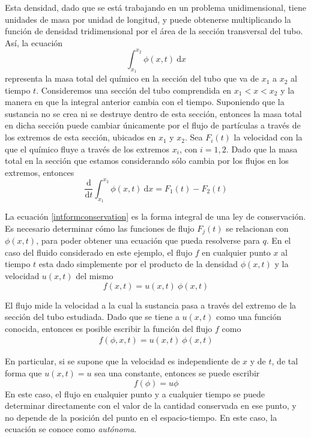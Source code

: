 \documentclass[11pt,twoside,openright,spanish]{report}
\numberwithin{equation}{chapter}
\numberwithin{figure}{chapter}
\numberwithin{table}{chapter}
\begin{document}
Esta densidad, dado que se está trabajando en un problema unidimensional, tiene unidades de masa por unidad de longitud, y puede obtenerse multiplicando la función de densidad tridimensional por el área de la sección transversal del tubo. Así, la ecuación
\begin{equation}
\int_{x_1}^{x_2}\phi(x,t)\ \text{d}x
\end{equation} 
representa la masa total del químico en la sección del tubo que va de $x_1$ a $x_2$ al tiempo $t$. Consideremos una sección del tubo comprendida en $x_1<x<x_2$ y la manera en que la integral anterior cambia con el tiempo. Suponiendo que la sustancia no se crea ni se destruye dentro de esta sección, entonces la masa total en dicha sección puede cambiar únicamente por el flujo de partículas a través de los extremos de esta sección, ubicados en $x_1$ y $x_2$. Sea $F_i(t)$ la velocidad con la que el químico fluye a través de los extremos $x_i$, con $i=1,2$. Dado que la masa total en la sección que estamos considerando sólo cambia por los flujos en los extremos, entonces
\begin{equation}
\frac{\text{d}}{\text{d}t}\int_{x_1}^{x_2}\phi(x,t)\ \text{d}x=F_1(t)-F_2(t)
\label{intformconservation}
\end{equation}

La ecuación \ref{intformconservation} es la forma integral de una ley de conservación. Es necesario determinar cómo las funciones de flujo $F_j(t)$ se relacionan con $\phi(x,t)$, para poder obtener una ecuación que pueda resolverse para $q$. En el caso del fluido considerado en este ejemplo, el flujo $f$ en cualquier punto $x$ al tiempo $t$ esta dado simplemente por el producto de la densidad $\phi(x,t)$ y la velocidad $u(x,t)$ del mismo
\begin{equation}
f(x,t)=u(x,t)\ \phi(x,t)
\end{equation}

El flujo mide la velocidad a la cual la sustancia pasa a través del extremo de la sección del tubo estudiada. Dado que se tiene a $u(x,t)$ como una función conocida, entonces es posible escribir la función del flujo $f$ como
\begin{eqnarray}
f(\phi,x,t)=u(x,t)\ \phi(x,t)
\end{eqnarray} 

En particular, si se supone que la velocidad es independiente de $x$ y de $t$, de tal forma que $u(x,t)=u$ sea una constante, entonces se puede escribir
\begin{equation}
f(\phi)=u\phi
\end{equation}
En este caso, el flujo en cualquier punto y a cualquier tiempo se puede determinar directamente con el valor de la cantidad conservada en ese punto, y no depende de la posición del punto en el espacio-tiempo. En este caso, la ecuación se conoce como \textit{autónoma}.
\end{document}

